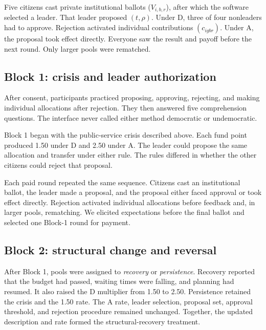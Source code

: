 \documentclass[11pt]{article}
\newcommand{\Dproc}{\textsf{D}}
\newcommand{\Aproc}{\textsf{A}}
\begin{document}
\begin{plainlanguagebox}
Five citizens cast private institutional ballots ($V_{i,b,r}$), after which the software selected a leader. That leader proposed $(t,\rho)$. Under \Dproc{}, three of four nonleaders had to approve. Rejection activated individual contributions $(c_{igbr})$. Under \Aproc{}, the proposal took effect directly. Everyone saw the result and payoff before the next round. Only larger pools were rematched.
\end{plainlanguagebox}

\subsection{Block 1: crisis and leader authorization}

After consent, participants practiced proposing, approving, rejecting, and making individual allocations after rejection. They then answered five comprehension questions. The interface never called either method democratic or undemocratic.

Block 1 began with the public-service crisis described above. Each fund point produced 1.50 under \Dproc{} and 2.50 under \Aproc{}. The leader could propose the same allocation and transfer under either rule. The rules differed in whether the other citizens could reject that proposal.

Each paid round repeated the same sequence. Citizens cast an institutional ballot, the leader made a proposal, and the proposal either faced approval or took effect directly. Rejection activated individual allocations before feedback and, in larger pools, rematching. We elicited expectations before the final ballot and selected one Block-1 round for payment.

\subsection{Block 2: structural change and reversal}

After Block 1, pools were assigned to \emph{recovery} or \emph{persistence}. Recovery reported that the budget had passed, waiting times were falling, and planning had resumed. It also raised the \Dproc{} multiplier from 1.50 to 2.50. Persistence retained the crisis and the 1.50 rate. The \Aproc{} rate, leader selection, proposal set, approval threshold, and rejection procedure remained unchanged. Together, the updated description and rate formed the structural-recovery treatment.
\end{document}
